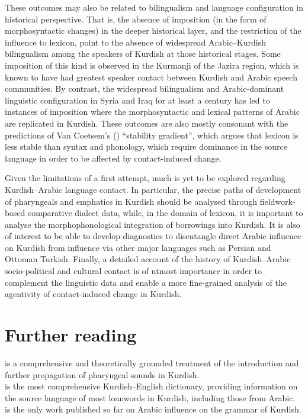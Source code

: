 \documentclass[output=paper]{langsci/langscibook}
\begin{document}
These outcomes may also be related to bilingualism and language configuration in historical perspective. That is, the absence of imposition (in the form of morphosyntactic changes) in the deeper historical layer, and the restriction of the influence to lexicon, point to the absence of widespread Arabic–Kurdish bilingualism among the speakers of Kurdish at those historical stages. Some imposition of this kind is observed in the Kurmanji of the Jazira region, which is known to have had greatest speaker contact between Kurdish and Arabic speech communities. By contrast, the widespread bilingualism and Arabic-dominant linguistic configuration in Syria and Iraq for at least a century has led to instances of imposition where the morphosyntactic and lexical patterns of Arabic are replicated in Kurdish. These outcomes are also mostly consonant with the predictions of Van Coetsem’s (\citeyear{VanCoetsem1988,VanCoetsem2000}) “stability gradient”, which argues that lexicon is less stable than syntax and phonology, which require dominance in the source language in order to be affected by contact-induced change.    

Given the limitations of a first attempt, much is yet to be explored regarding Kurdish–Arabic language contact. In particular, the precise paths of development of pharyngeals and emphatics in Kurdish should be analysed through fieldwork-based comparative dialect data, while, in the domain of lexicon, it is important to analyse the morphophonological integration of borrowings into Kurdish. It is also of interest to be able to develop diagnostics to disentangle direct Arabic influence on Kurdish from influence via other major languages such as Persian and Ottoman Turkish. Finally, a detailed account of the history of Kurdish–Arabic socio-political and cultural contact is of utmost importance in order to complement the linguistic data and enable a more fine-grained analysis of the agentivity of contact-induced change in Kurdish.      

\section*{Further reading}
\citet{Barryforthcoming} is a comprehensive and theoretically grounded treatment of the introduction and further propagation of pharyngeal sounds in Kurdish.\\ 
\citet{Chyet2003} is the most comprehensive Kurdish–English dictionary,  providing information on the source language of most loanwords in Kurdish, including those from Arabic.\\
\citet{Tsabolov1994} is the only work published so far on Arabic influence on the grammar of Kurdish. 
\end{document}
